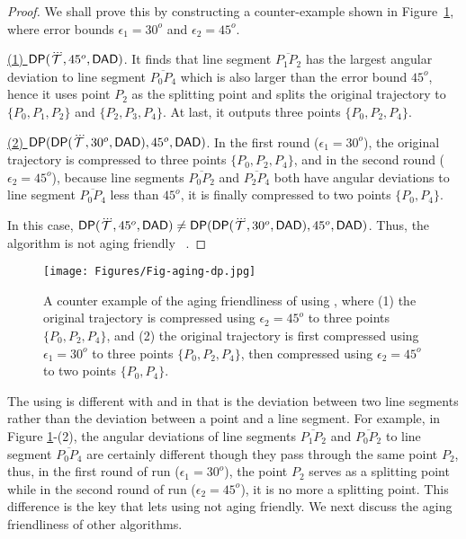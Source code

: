 \begin{proof}
	We shall prove this by constructing a counter-example shown in Figure~\ref{fig:aging-dp-dad}, where error bounds $\epsilon_1 =30^o$ and $\epsilon_2=45^o$.
	
	\underline{(1) ${{\mathsf{DP}}}(\dddot{\mathcal{T}}, 45^o, {\mathsf{DAD}})$}. It finds that line segment $\overline{P_1P_2}$ has the largest angular deviation to line segment $\overline{P_0P_4}$ which is also larger than the error bound $45^o$, hence it uses point $P_2$ as the splitting point and splits the original trajectory to $\{P_0, P_1, P_2\}$ and $\{P_2, P_3, P_4\}$. At last, it outputs three points $\{P_0, P_2, P_4\}$.
	
	\underline{(2) ${{\mathsf{DP}}}({\mathsf{DP}}(\dddot{\mathcal{T}}, 30^o, {\mathsf{DAD}}), 45^o, {\mathsf{DAD}})$}. In the first round ($\epsilon_1=30^o$), the original trajectory is compressed to three points $\{P_0, P_2, P_4\}$, and in the second round ($\epsilon_2=45^o$), because line segments  $\overline{P_0P_2}$ and $\overline{P_2P_4}$ both have angular deviations to line segment $\overline{P_0P_4}$ less than $45^o$, it is finally compressed to two points $\{P_0, P_4\}$.
	
	In this case, ${{\mathsf{DP}}}(\dddot{\mathcal{T}}, 45^o, {\mathsf{DAD}}) \ne {{\ensuremath {\mathsf{DP}}}}({\mathsf{DP}}(\dddot{\mathcal{T}}, 30^o, {\mathsf{DAD}}), 45^o, {\mathsf{DAD}})$. Thus, the \dpa algorithm is not aging friendly \wrt~\dad.
\end{proof}

\begin{figure}
	\centering
	\texttt{[image: Figures/Fig-aging-dp.jpg]}
	
	\caption{\small A counter example of the aging friendliness of \dpa using \dad, where (1) the original trajectory is compressed using $\epsilon_2=45^o$ to three points $\{P_0, P_2, P_4\}$, and (2) the original trajectory is first compressed using $\epsilon_1=30^o$ to three points $\{P_0, P_2, P_4\}$, then compressed using $\epsilon_2=45^o$ to two points $\{P_0, P_4\}$. }
	\vspace{-1ex}
	\label{fig:aging-dp-dad}
\end{figure}

The \dpa using \dad is different with \ped and \sed in that \dad is the deviation between two line segments rather than the deviation between a point and a line segment. For example, in Figure \ref{fig:aging-dp-dad}-(2), the angular deviations of line segments $\overline{P_1P_2}$ and $\overline{P_0P_2}$ to line segment $\overline{P_0P_4}$ are certainly different though they pass through the same point $P_2$, thus, in the first round of run ($\epsilon_1=30^o$), the point $P_2$ serves as a splitting point while in the second round of run ($\epsilon_2=45^o$), it is no more a splitting point. This difference is the key that lets \dpa using \dad not aging friendly.
%
We next discuss the aging friendliness of other algorithms.

